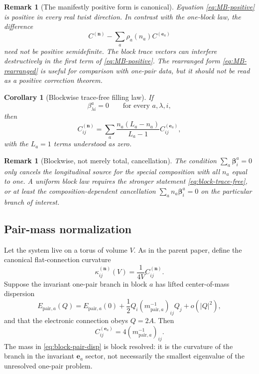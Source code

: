 \documentclass[11pt]{article}
\numberwithin{equation}{section}
\newtheorem{corollary}[theorem]{Corollary}
\newtheorem{remark}[theorem]{Remark}
\newcommand{\bn}{\mathbf n}
\newcommand{\be}{\mathbf e}
\newcommand{\bbeta}{\boldsymbol\beta}
\begin{document}
\begin{remark}[The manifestly positive form is canonical]
Equation \eqref{eq:MB-positive} is positive in every real twist direction.  In contrast with the one-block law, the difference
\begin{equation}
 C^{(\bn)}-\sum_a\rho_a(n_a)C^{(\be_a)}
 \label{eq:not-positive-difference}
\end{equation}
need not be positive semidefinite.  The block trace vectors can interfere destructively in the first term of \eqref{eq:MB-positive}.  The rearranged form \eqref{eq:MB-rearranged} is useful for comparison with one-pair data, but it should not be read as a positive correction theorem.
\end{remark}

\begin{corollary}[Blockwise trace-free filling law]
\label{cor:trace-free}
If
\begin{equation}
 \beta_{\lambda i}^a=0
 \qquad
 \text{for every }a,\lambda,i,
 \label{eq:block-trace-free}
\end{equation}
then
\begin{equation}
 \boxed{
 C_{ij}^{(\bn)}
 =\sum_a
 \frac{n_a(L_a-n_a)}{L_a-1}
 C_{ij}^{(\be_a)},}
 \label{eq:trace-free-law}
\end{equation}
with the $L_a=1$ terms understood as zero.
\end{corollary}

\begin{remark}[Blockwise, not merely total, cancellation]
The condition $\sum_a\bbeta_i^a=0$ only cancels the longitudinal source for the special composition with all $n_a$ equal to one.  A uniform block law requires the stronger statement \eqref{eq:block-trace-free}, or at least the composition-dependent cancellation $\sum_an_a\bbeta_i^a=0$ on the particular branch of interest.
\end{remark}

\subsection{Pair-mass normalization}

Let the system live on a torus of volume $V$.  As in the parent paper, define the canonical flat-connection curvature
\begin{equation}
 \kappa_{ij}^{(\bn)}(V)=\frac1{4V}C_{ij}^{(\bn)}.
 \label{eq:kappa-def}
\end{equation}
Suppose the invariant one-pair branch in block $a$ has lifted center-of-mass dispersion
\begin{equation}
 E_{\mathrm{pair},a}(Q)
 =E_{\mathrm{pair},a}(0)
 +\frac12Q_i(m_{\mathrm{pair},a}^{-1})_{ij}Q_j
 +o(|Q|^2),
 \label{eq:block-pair-disp}
\end{equation}
and that the electronic connection obeys $Q=2A$.  Then
\begin{equation}
 C_{ij}^{(\be_a)}=4(m_{\mathrm{pair},a}^{-1})_{ij}.
 \label{eq:block-C-mass}
\end{equation}
The mass in \eqref{eq:block-pair-disp} is block resolved: it is the curvature of the branch in the invariant $\be_a$ sector, not necessarily the smallest eigenvalue of the unresolved one-pair problem.
\end{document}
